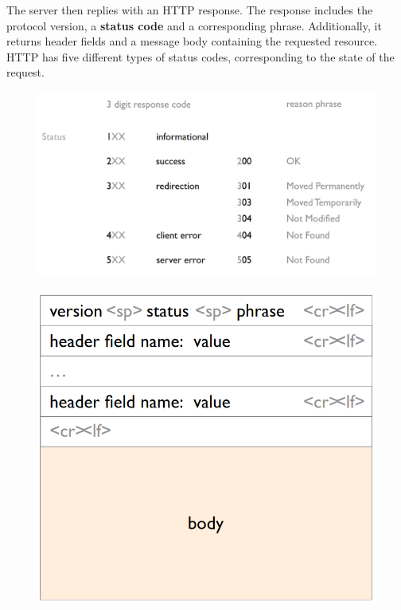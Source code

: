 The server then replies with an HTTP response. The response includes the protocol version, a \textbf{status code} and a corresponding phrase. Additionally, it returns header fields and a message body containing the requested resource. HTTP has five different types of status codes, corresponding to the state of the request.
\begin{figure}[H]
\begin{minipage}[t]{.5\textwidth}
\centering
\includegraphics[width=\textwidth]{images/http-status.PNG}
\label{http_status}
\end{minipage}
\begin{minipage}[t]{.5\textwidth}
\centering
\includegraphics[width=\textwidth]{images/http-response.PNG}
\label{http_response}
\end{minipage}
\end{figure}
